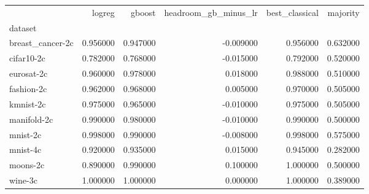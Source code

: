 \begin{tabular}{lrrrrr}
\toprule
 & logreg & gboost & headroom_gb_minus_lr & best_classical & majority \\
dataset &  &  &  &  &  \\
\midrule
breast_cancer-2c & 0.956000 & 0.947000 & -0.009000 & 0.956000 & 0.632000 \\
cifar10-2c & 0.782000 & 0.768000 & -0.015000 & 0.792000 & 0.520000 \\
eurosat-2c & 0.960000 & 0.978000 & 0.018000 & 0.988000 & 0.510000 \\
fashion-2c & 0.962000 & 0.968000 & 0.005000 & 0.970000 & 0.505000 \\
kmnist-2c & 0.975000 & 0.965000 & -0.010000 & 0.975000 & 0.505000 \\
manifold-2c & 0.990000 & 0.980000 & -0.010000 & 0.990000 & 0.500000 \\
mnist-2c & 0.998000 & 0.990000 & -0.008000 & 0.998000 & 0.575000 \\
mnist-4c & 0.920000 & 0.935000 & 0.015000 & 0.945000 & 0.282000 \\
moons-2c & 0.890000 & 0.990000 & 0.100000 & 1.000000 & 0.500000 \\
wine-3c & 1.000000 & 1.000000 & 0.000000 & 1.000000 & 0.389000 \\
\bottomrule
\end{tabular}
